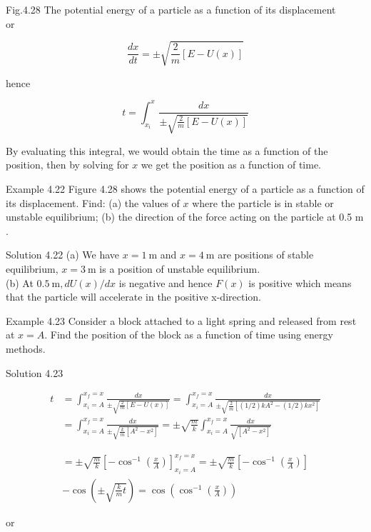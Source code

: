\documentclass[10pt]{article}
\begin{document}
Fig.4.28 The potential energy of a particle as a function of its displacement\\
or

$$
\frac{d x}{d t}= \pm \sqrt{\frac{2}{m}[E-U(x)]}
$$

hence

$$
t=\int_{x_{\mathrm{i}}}^{x} \frac{d x}{ \pm \sqrt{\frac{2}{m}[E-U(x)]}}
$$

By evaluating this integral, we would obtain the time as a function of the position, then by solving for $x$ we get the position as a function of time.

Example 4.22 Figure 4.28 shows the potential energy of a particle as a function of its displacement. Find: (a) the values of $x$ where the particle is in stable or unstable equilibrium; (b) the direction of the force acting on the particle at 0.5 m .

Solution 4.22 (a) We have $x=1 \mathrm{~m}$ and $x=4 \mathrm{~m}$ are positions of stable equilibrium, $x=3 \mathrm{~m}$ is a position of unstable equilibrium.\\
(b) At $0.5 \mathrm{~m}, d U(x) / d x$ is negative and hence $F(x)$ is positive which means that the particle will accelerate in the positive x-direction.

Example 4.23 Consider a block attached to a light spring and released from rest at $x=A$. Find the position of the block as a function of time using energy methods.

Solution 4.23

$$
\begin{aligned}
t & =\int_{x_{i}=A}^{x_{f}=x} \frac{d x}{ \pm \sqrt{\frac{2}{m}[E-U(x)]}}=\int_{x_{i}=A}^{x_{f}=x} \frac{d x}{ \pm \sqrt{\frac{2}{m}\left[(1 / 2) k A^{2}-(1 / 2) k x^{2}\right]}} \\
& =\int_{x_{i}=A}^{x_{f}=x} \frac{d x}{ \pm \sqrt{\frac{k}{m}\left[A^{2}-x^{2}\right]}}= \pm \sqrt{\frac{m}{k}} \int_{x_{i}=A}^{x_{f}=x} \frac{d x}{\sqrt{\left[A^{2}-x^{2}\right]}}
\end{aligned}
$$

$$
\begin{gathered}
= \pm \sqrt{\frac{m}{k}}\left[-\cos ^{-1}\left(\frac{x}{A}\right)\right]_{x_{i}=A}^{x_{f}=x}= \pm \sqrt{\frac{m}{k}}\left[-\cos ^{-1}\left(\frac{x}{A}\right)\right] \\
-\cos \left( \pm \sqrt{\frac{k}{m} t}\right)=\cos \left(\cos ^{-1}\left(\frac{x}{A}\right)\right)
\end{gathered}
$$

or
\end{document}
